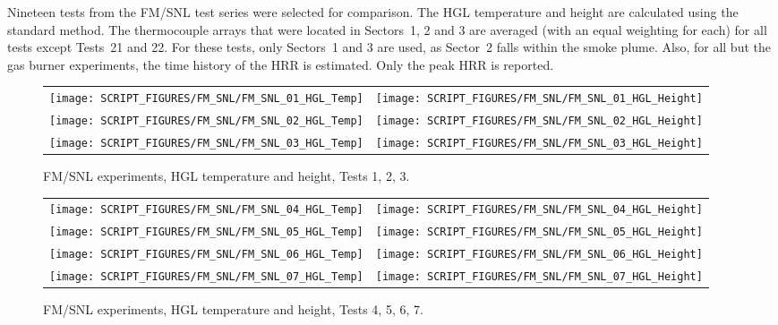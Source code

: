 Nineteen tests from the FM/SNL test series were selected for comparison. The HGL temperature and height are calculated using the standard method. The thermocouple arrays that were located in Sectors~1, 2 and 3 are averaged (with an equal weighting for each) for all tests except Tests~21 and 22. For these tests, only Sectors~1 and 3 are used, as Sector~2 falls within the smoke plume. Also, for all but the gas burner experiments, the time history of the HRR is estimated. Only the peak HRR is reported.


\begin{figure}[!h]
\begin{tabular*}{\textwidth}{l@{\extracolsep{\fill}}r}
\texttt{[image: SCRIPT\_FIGURES/FM\_SNL/FM\_SNL\_01\_HGL\_Temp]} &
\texttt{[image: SCRIPT\_FIGURES/FM\_SNL/FM\_SNL\_01\_HGL\_Height]} \\
\texttt{[image: SCRIPT\_FIGURES/FM\_SNL/FM\_SNL\_02\_HGL\_Temp]} &
\texttt{[image: SCRIPT\_FIGURES/FM\_SNL/FM\_SNL\_02\_HGL\_Height]} \\
\texttt{[image: SCRIPT\_FIGURES/FM\_SNL/FM\_SNL\_03\_HGL\_Temp]} &
\texttt{[image: SCRIPT\_FIGURES/FM\_SNL/FM\_SNL\_03\_HGL\_Height]}
\end{tabular*}
\caption[FM/SNL experiments, HGL temperature and height, Tests 1, 2, 3]
{FM/SNL experiments, HGL temperature and height, Tests 1, 2, 3.}
\label{FM_SNL_HGL_1}
\end{figure}

\newpage

\begin{figure}[p]
\begin{tabular*}{\textwidth}{l@{\extracolsep{\fill}}r}
\texttt{[image: SCRIPT\_FIGURES/FM\_SNL/FM\_SNL\_04\_HGL\_Temp]} &
\texttt{[image: SCRIPT\_FIGURES/FM\_SNL/FM\_SNL\_04\_HGL\_Height]} \\
\texttt{[image: SCRIPT\_FIGURES/FM\_SNL/FM\_SNL\_05\_HGL\_Temp]} &
\texttt{[image: SCRIPT\_FIGURES/FM\_SNL/FM\_SNL\_05\_HGL\_Height]} \\
\texttt{[image: SCRIPT\_FIGURES/FM\_SNL/FM\_SNL\_06\_HGL\_Temp]} &
\texttt{[image: SCRIPT\_FIGURES/FM\_SNL/FM\_SNL\_06\_HGL\_Height]} \\
\texttt{[image: SCRIPT\_FIGURES/FM\_SNL/FM\_SNL\_07\_HGL\_Temp]} &
\texttt{[image: SCRIPT\_FIGURES/FM\_SNL/FM\_SNL\_07\_HGL\_Height]}
\end{tabular*}
\caption[FM/SNL experiments, HGL temperature and height, Tests 4, 5, 6, 7]
{FM/SNL experiments, HGL temperature and height, Tests 4, 5, 6, 7.}
\label{FM_SNL_HGL_2}
\end{figure}

